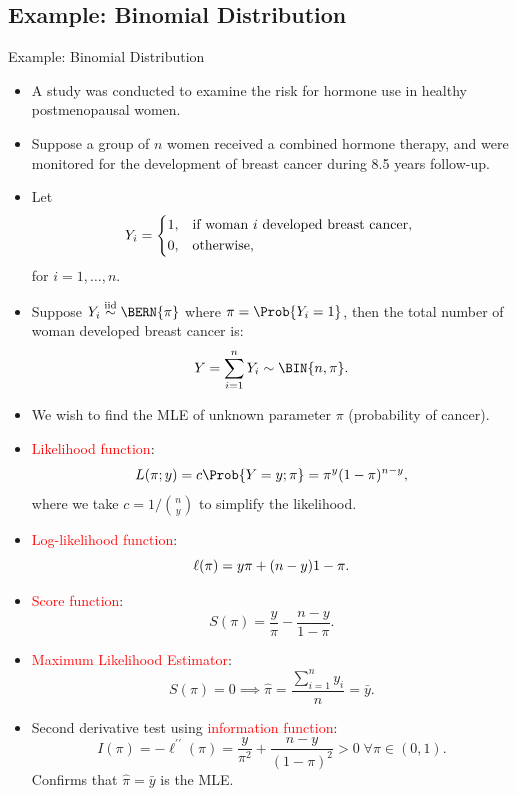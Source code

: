 \documentclass{article}\usepackage[]{graphicx}\usepackage[svgnames]{xcolor}
\let\log\relax%
\newcommand{\iid}{\overset{\text{iid}}{\sim}}%
\begin{document}
\subsection*{Example: Binomial Distribution}
\begin{Example}{Example: Binomial Distribution}
      \begin{itemize}
            \item A study was conducted to examine the risk for hormone use in healthy
                  postmenopausal women.
            \item Suppose a group of $ n $ women received a combined hormone therapy, and were
                  monitored for the development of breast cancer during 8.5 years follow-up.
            \item Let
                  \[ Y_i=\begin{cases*}
                              1, & if woman $ i $ developed breast cancer, \\
                              0, & otherwise,
                        \end{cases*} \]
                  for $ i=1,\ldots,n $.
            \item Suppose $ Y_i \iid\BERN{\pi} $ where $ \pi=\Prob{Y_i=1} $, then the total number of woman developed breast cancer is:
                  \[ Y=\sum_{i=1}^{n} Y_i \sim \BIN{n,\pi}. \]
            \item We wish to find the MLE of unknown parameter $ \pi $ (probability of cancer).
      \end{itemize}
\end{Example}
\begin{itemize}
      \item \textcolor{Red}{Likelihood function}:
            \[ L(\pi;y)=c\Prob{Y=y;\pi}=\pi^y(1-\pi)^{n-y}, \]
            where we take $ c=1/\binom{n}{y} $ to simplify the likelihood.
      \item \textcolor{Red}{Log-likelihood function}:
            \[ \ell(\pi)=y\log{\pi}+(n-y)\log{1-\pi}. \]
      \item \textcolor{Red}{Score function}:
            \[ S(\pi)=\frac{y}{\pi}-\frac{n-y}{1-\pi}.  \]
      \item \textcolor{Red}{Maximum Likelihood Estimator}:
            \[ S(\pi)=0\implies \hat{\pi}=\frac{\sum_{i=1}^{n} y_i}{n}=\bar{y}. \]
      \item Second derivative test using \textcolor{Red}{information function}:
            \[ I(\pi)=-\ell^{\prime\prime}(\pi)=\frac{y}{\pi^2}+\frac{n-y}{(1-\pi)^2}>0\; \forall \pi\in(0,1). \]
            Confirms that $ \hat{\pi}=\bar{y} $ is the MLE\@.
\end{itemize}
\end{document}
